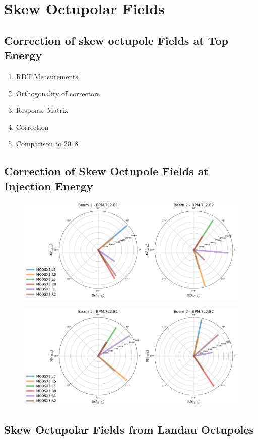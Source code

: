 \chapter{Skew Octupolar Fields}
\label{chapter:skew_octupole_fields}
\thumbforchapter{}

\section{Correction of skew octupole Fields at Top Energy}

\begin{enumerate}
    \color{red}
    \item RDT Measurements
    \item Orthogonality of correctors
    \item Response Matrix
    \item Correction
    \item Comparison to 2018
\end{enumerate}


\section{Correction of Skew Octupole Fields at Injection Energy}

\begin{figure}[H]
    \includegraphics[width=\textwidth]{./chapters/07_octupoles/images/f1012_y_injection.pdf}
    \caption{}
    \label{fig:a4_injection_orthogonal_f1012}
\end{figure}

\begin{figure}[H]
    \includegraphics[width=\textwidth]{chapters/07_octupoles/images/f1210_x_injection.pdf}
    \caption{}
    \label{fig:a4_injection_orthogonal_f1210}
\end{figure}





\section{Skew Octupolar Fields from Landau Octupoles}